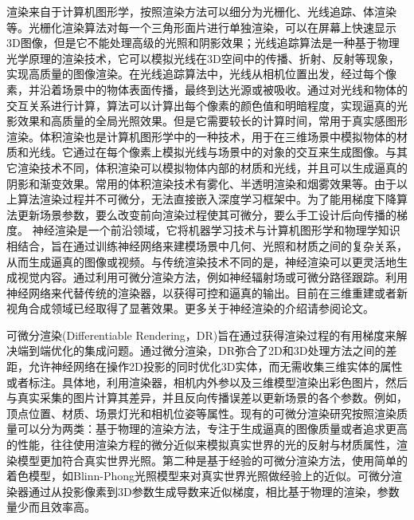 渲染来自于计算机图形学，按照渲染方法可以细分为光栅化、光线追踪、体渲染等。光栅化渲染算法对每一个三角形面片进行单独渲染，可以在屏幕上快速显示3D图像，但是它不能处理高级的光照和阴影效果；光线追踪算法是一种基于物理光学原理的渲染技术，它可以模拟光线在3D空间中的传播、折射、反射等现象，实现高质量的图像渲染。在光线追踪算法中，光线从相机位置出发，经过每个像素，并沿着场景中的物体表面传播，最终到达光源或被吸收。通过对光线和物体的交互关系进行计算，算法可以计算出每个像素的颜色值和明暗程度，实现逼真的光影效果和高质量的全局光照效果。但是它需要较长的计算时间，常用于真实感图形渲染。体积渲染也是计算机图形学中的一种技术，用于在三维场景中模拟物体的材质和光线。它通过在每个像素上模拟光线与场景中的对象的交互来生成图像。与其它渲染技术不同，体积渲染可以模拟物体内部的材质和光线，并且可以生成逼真的阴影和渐变效果。常用的体积渲染技术有雾化、半透明渲染和烟雾效果等。由于以上算法渲染过程并不可微分，无法直接嵌入深度学习框架中。为了能用梯度下降算法更新场景参数，要么改变前向渲染过程使其可微分，要么手工设计后向传播的梯度。
神经渲染是一个前沿领域，它将机器学习技术与计算机图形学和物理学知识相结合，旨在通过训练神经网络来建模场景中几何、光照和材质之间的复杂关系，从而生成逼真的图像或视频。与传统渲染技术不同的是，神经渲染可以更灵活地生成视觉内容。通过利用可微分渲染方法，例如神经辐射场或可微分路径跟踪。利用神经网络来代替传统的渲染器，以获得可控和逼真的输出。目前在三维重建或者新视角合成领域已经取得了显著效果。更多关于神经渲染的介绍请参阅论文。\par
可微分渲染(Differentiable Rendering，DR)旨在通过获得渲染过程的有用梯度来解决端到端优化的集成问题。通过微分渲染，DR弥合了2D和3D处理方法之间的差距，允许神经网络在操作2D投影的同时优化3D实体，而无需收集三维实体的属性或者标注。具体地，利用渲染器，相机内外参以及三维模型渲染出彩色图片，然后与真实采集的图片计算其差异，并且反向传播误差以更新场景的各个参数。例如，顶点位置、材质、场景灯光和相机位姿等属性。现有的可微分渲染研究按照渲染质量可以分为两类：基于物理的渲染方法，专注于生成逼真的图像质量或者追求更高的性能，往往使用渲染方程的微分近似来模拟真实世界的光的反射与材质属性，渲染模型更加符合真实世界光照。第二种是基于经验的可微分渲染方法，使用简单的着色模型，如Blinn-Phong光照模型来对真实世界光照做经验上的近似。可微分渲染器通过从投影像素到3D参数生成导数来近似梯度，相比基于物理的渲染，参数量少而且效率高。\par

